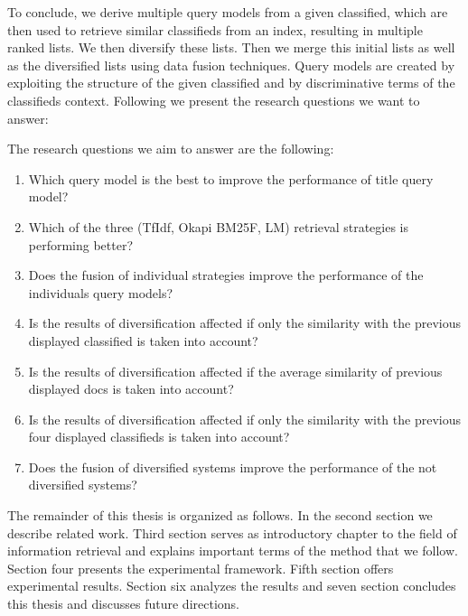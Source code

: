 To conclude, we derive multiple query models from a given classified, which are then used to retrieve similar classifieds from an index, resulting in multiple ranked lists. We then diversify these lists. Then we merge this initial lists as well as the diversified lists using data fusion techniques. Query models are created by exploiting the structure of the given classified and by discriminative terms of the classifieds context. Following we present the research questions we want to answer:

The research questions we aim to answer are the following:
\begin{enumerate}
\item Which query model is the best to improve the performance of title query model?
\item Which of the three (TfIdf, Okapi BM25F, LM) retrieval strategies is performing better?
\item Does the fusion of individual strategies improve the performance of the individuals query models?
\item Is the results of diversification affected if only the similarity with the previous displayed classified is taken into account?
\item Is the results of diversification affected if the average similarity of previous displayed docs is taken into account?
\item Is the results of diversification affected if only the similarity with the previous four displayed classifieds is taken into account?
\item Does the fusion of diversified systems improve the performance of the not diversified systems?
\end{enumerate}

The remainder of this thesis is organized as follows. In the second section we describe related work. Third section serves as introductory chapter to the field of information retrieval and explains important terms of the method that we follow. Section four presents the experimental framework. Fifth section offers experimental results. Section six analyzes the results and seven section concludes this thesis and discusses future directions.




